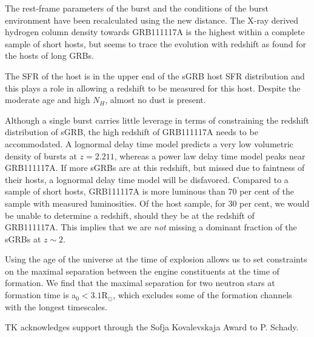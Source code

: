 \documentclass{aa}    %
\begin{document}
The rest-frame parameters of the burst and the conditions of the burst environment have been recalculated using the new distance. The X-ray derived hydrogen column density towards GRB111117A is the highest within a complete sample of short hosts, but seems to trace the evolution with redshift as found for the hosts of long GRBs. 

The SFR of the host is in the upper end of the sGRB host SFR distribution and this plays a role in allowing a redshift to be measured for this host. Despite the moderate age and high $N_H$, almost no dust is present.

Although a single burst carries little leverage in terms of constraining the redshift distribution of sGRB, the high redshift of GRB111117A needs to be accommodated. A lognormal delay time model predicts a very low volumetric density of bursts at $z = 2.211$, whereas a power law delay time model peaks near GRB111117A. If more sGRBs are at this redshift, but missed due to faintness of their hosts, a lognormal delay time model will be disfavored. Compared to a sample of short hosts, GRB111117A is more luminous than 70 per cent of the sample with measured luminosities. Of the host sample, for 30 per cent, we would be unable to determine a redshift, should they be at the redshift of GRB111117A. This implies that we are \textit{not} missing a dominant fraction of the sGRBs at $z \sim 2$.

Using the age of the universe at the time of explosion allows us to set constraints on the maximal separation between the engine constituents at the time of formation. We find that the maximal separation for two neutron stars at formation time is a$_0 < 3.1 $R$_\odot$, which excludes some of the formation channels with the longest timescales. 


\begin{acknowledgements}
TK acknowledges support through the Sofja Kovalevskaja Award to P. Schady.
\end{acknowledgements}




\newpage




\end{document}
